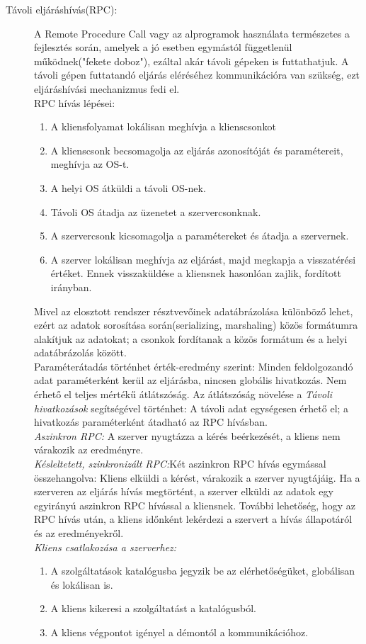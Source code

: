 \documentclass[12pt]{article}
\begin{document}
\begin{description}
\item[Távoli eljáráshívás(RPC):] A Remote Procedure Call vagy az alprogramok használata természetes a fejlesztés során, amelyek a jó esetben egymástól függetlenül működnek("fekete doboz"), ezáltal akár távoli gépeken is futtathatjuk. A távoli gépen futtatandó eljárás eléréséhez kommunikációra van szükség, ezt eljáráshívási mechanizmus fedi el.\\RPC hívás lépései:\\\begin{enumerate}\item A kliensfolyamat lokálisan meghívja a klienscsonkot\item A klienscsonk becsomagolja az eljárás azonosítóját és paramétereit, meghívja az OS-t.\item A helyi OS átküldi a távoli OS-nek.\item Távoli OS átadja az üzenetet a szervercsonknak. \item A szervercsonk kicsomagolja a paramétereket és átadja a szervernek.\item A szerver lokálisan meghívja az eljárást, majd megkapja a visszatérési értéket. Ennek visszaküldése a kliensnek hasonlóan zajlik, fordított irányban.\end{enumerate}Mivel az elosztott rendszer résztvevőinek adatábrázolása különböző lehet, ezért az adatok sorosítása során(serializing, marshaling) közös formátumra alakítjuk az adatokat; a csonkok fordítanak a közös formátum és a helyi adatábrázolás között.\\Paraméterátadás történhet érték-eredmény szerint: Minden feldolgozandó adat paraméterként kerül az eljárásba, nincsen globális hivatkozás. Nem érhető el teljes mértékű átlátszóság. Az átlátszóság növelése a \textit{Távoli hivatkozások} segítségével történhet: A távoli adat egységesen érhető el; a hivatkozás paraméterként átadható az RPC hívásban.\\\textit{Aszinkron RPC:} A szerver nyugtázza a kérés beérkezését, a kliens nem várakozik az eredményre.\\\textit{Késleltetett, szinkronizált RPC:}Két aszinkron RPC hívás egymással összehangolva: Kliens elküldi a kérést, várakozik a szerver nyugtájáig. Ha a szerveren az eljárás hívás megtörtént, a szerver elküldi az adatok egy egyirányú aszinkron RPC hívással a kliensnek. További lehetőség, hogy az RPC hívás után, a kliens időnként lekérdezi a szervert a hívás állapotáról és az eredményekről.\\\textit{Kliens csatlakozása a szerverhez:}\begin{enumerate}\item A szolgáltatások katalógusba jegyzik be az elérhetőségüket, globálisan és lokálisan is.\item A kliens kikeresi a szolgáltatást a katalógusból.\item A kliens végpontot igényel a démontól a kommunikációhoz.\end{enumerate}
\end{description}
\end{document}
